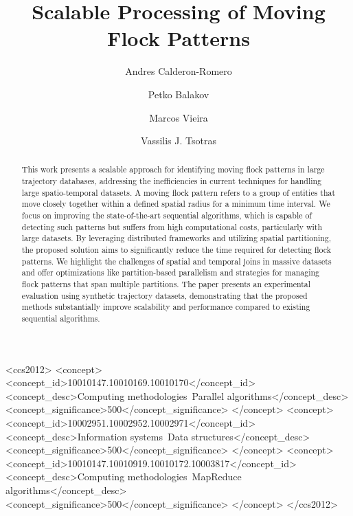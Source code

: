 \documentclass[article,screen]{acmart}
\begin{document}
\title{Scalable Processing of Moving Flock Patterns}
\author{Andres Calderon-Romero}

\author{Petko Balakov}

\author{Marcos Vieira}

\author{Vassilis J. Tsotras}

\renewcommand{\shortauthors}{Calderon, et al.}

\begin{abstract}
This work presents a scalable approach for identifying moving flock patterns in large trajectory databases, addressing the inefficiencies in current techniques for handling large spatio-temporal datasets. A moving flock pattern refers to a group of entities that move closely together within a defined spatial radius for a minimum time interval. We focus on improving the state-of-the-art sequential algorithms, which is capable of detecting such patterns but suffers from high computational costs, particularly with large datasets. By leveraging distributed frameworks and utilizing spatial partitioning, the proposed solution aims to significantly reduce the time required for detecting flock patterns. We highlight the challenges of spatial and temporal joins in massive datasets and offer optimizations like partition-based parallelism and strategies for managing flock patterns that span multiple partitions. The paper presents an experimental evaluation using synthetic trajectory datasets, demonstrating that the proposed methods substantially improve scalability and performance compared to existing sequential algorithms.

\end{abstract}

\begin{CCSXML}
<ccs2012>
   <concept>
       <concept_id>10010147.10010169.10010170</concept_id>
       <concept_desc>Computing methodologies~Parallel algorithms</concept_desc>
       <concept_significance>500</concept_significance>
       </concept>
   <concept>
       <concept_id>10002951.10002952.10002971</concept_id>
       <concept_desc>Information systems~Data structures</concept_desc>
       <concept_significance>500</concept_significance>
       </concept>
   <concept>
       <concept_id>10010147.10010919.10010172.10003817</concept_id>
       <concept_desc>Computing methodologies~MapReduce algorithms</concept_desc>
       <concept_significance>500</concept_significance>
       </concept>
 </ccs2012>
\end{CCSXML}
\end{document}
